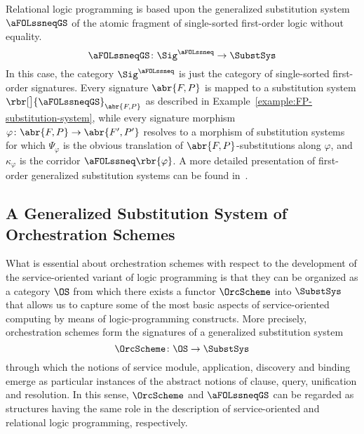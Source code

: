 \documentclass{LMCS}
\begin{document}
  \begin{exa}
    Relational logic programming is based upon the generalized substitution system \(\aFOLssneqGS\) of the atomic fragment of single-sorted first-order logic  without equality.
    \[
    \aFOLssneqGS \colon \Sig^{\aFOLssneq} \to \SubstSys
    \]
    In this case, the category \(\Sig^{\aFOLssneq}\) is just the category of single-sorted first-order signatures.
    Every signature \(\abr{F, P}\) is  mapped to a substitution system \(\rbr[\big]{\aFOLssneqGS}_{\abr{F, P}}\) as described in Example~\ref{example:FP-substitution-system}, while every signature morphism \(\varphi \colon \abr{F, P} \to \abr{F', P'}\) resolves to a morphism of substitution systems for which \(\Psi_{\varphi}\) is the obvious translation of \(\abr{F, P}\)\nb-substitutions along \(\varphi\), and \(\kappa_{\varphi}\) is the corridor \(\aFOLssneq\rbr{\varphi}\).
    A more detailed presentation of first-order generalized substitution systems can be found in~\cite{Tutu-Fiadeiro:Institution-independent-logic-programming-2015}.
  \end{exa}


  \subsection{A Generalized Substitution System of Orchestration Schemes}

  What is essential about orchestration schemes with respect to the development of the service-oriented variant of logic programming is that they can be organized as a category \(\OS\) from which there exists a functor \(\OrcScheme\) into \(\SubstSys\) that allows us to capture some of the most basic aspects of service-oriented computing by means of logic-programming constructs.
  More precisely, orchestration schemes form the signatures of a generalized substitution system
  \[
  \OrcScheme \colon \OS \to \SubstSys
  \]
  through which the notions of service module, application, discovery and binding emerge as particular instances of the abstract notions of clause, query, unification and resolution.
  In this sense, \(\OrcScheme\) and \(\aFOLssneqGS\) can be regarded as structures having the same role in the description of service-oriented and relational logic programming, respectively.
\end{document}
